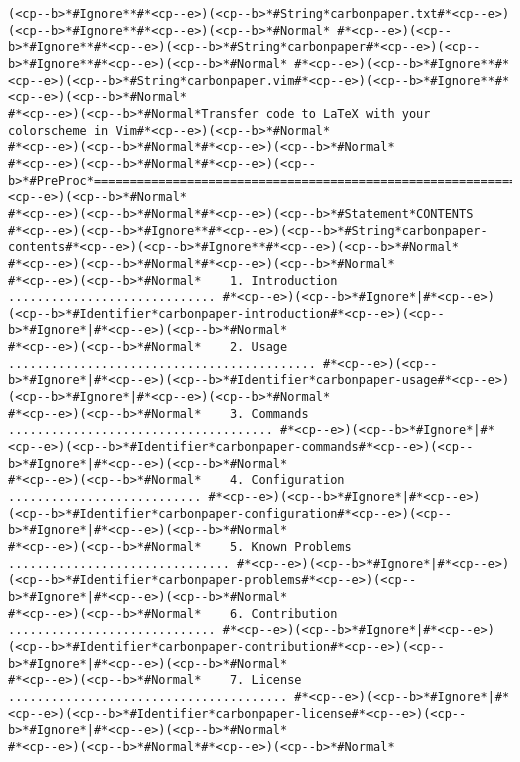 \begin{lstlisting}[style=carbonpaper]
(<cp--b>*#Ignore**#*<cp--e>)(<cp--b>*#String*carbonpaper.txt#*<cp--e>)(<cp--b>*#Ignore**#*<cp--e>)(<cp--b>*#Normal* #*<cp--e>)(<cp--b>*#Ignore**#*<cp--e>)(<cp--b>*#String*carbonpaper#*<cp--e>)(<cp--b>*#Ignore**#*<cp--e>)(<cp--b>*#Normal* #*<cp--e>)(<cp--b>*#Ignore**#*<cp--e>)(<cp--b>*#String*carbonpaper.vim#*<cp--e>)(<cp--b>*#Ignore**#*<cp--e>)(<cp--b>*#Normal*
#*<cp--e>)(<cp--b>*#Normal*Transfer code to LaTeX with your colorscheme in Vim#*<cp--e>)(<cp--b>*#Normal*
#*<cp--e>)(<cp--b>*#Normal*#*<cp--e>)(<cp--b>*#Normal*
#*<cp--e>)(<cp--b>*#Normal*#*<cp--e>)(<cp--b>*#PreProc*==============================================================================#*<cp--e>)(<cp--b>*#Normal*
#*<cp--e>)(<cp--b>*#Normal*#*<cp--e>)(<cp--b>*#Statement*CONTENTS                                                #*<cp--e>)(<cp--b>*#Ignore**#*<cp--e>)(<cp--b>*#String*carbonpaper-contents#*<cp--e>)(<cp--b>*#Ignore**#*<cp--e>)(<cp--b>*#Normal*
#*<cp--e>)(<cp--b>*#Normal*#*<cp--e>)(<cp--b>*#Normal*
#*<cp--e>)(<cp--b>*#Normal*    1. Introduction ............................. #*<cp--e>)(<cp--b>*#Ignore*|#*<cp--e>)(<cp--b>*#Identifier*carbonpaper-introduction#*<cp--e>)(<cp--b>*#Ignore*|#*<cp--e>)(<cp--b>*#Normal*
#*<cp--e>)(<cp--b>*#Normal*    2. Usage ........................................... #*<cp--e>)(<cp--b>*#Ignore*|#*<cp--e>)(<cp--b>*#Identifier*carbonpaper-usage#*<cp--e>)(<cp--b>*#Ignore*|#*<cp--e>)(<cp--b>*#Normal*
#*<cp--e>)(<cp--b>*#Normal*    3. Commands ..................................... #*<cp--e>)(<cp--b>*#Ignore*|#*<cp--e>)(<cp--b>*#Identifier*carbonpaper-commands#*<cp--e>)(<cp--b>*#Ignore*|#*<cp--e>)(<cp--b>*#Normal*
#*<cp--e>)(<cp--b>*#Normal*    4. Configuration ........................... #*<cp--e>)(<cp--b>*#Ignore*|#*<cp--e>)(<cp--b>*#Identifier*carbonpaper-configuration#*<cp--e>)(<cp--b>*#Ignore*|#*<cp--e>)(<cp--b>*#Normal*
#*<cp--e>)(<cp--b>*#Normal*    5. Known Problems ............................... #*<cp--e>)(<cp--b>*#Ignore*|#*<cp--e>)(<cp--b>*#Identifier*carbonpaper-problems#*<cp--e>)(<cp--b>*#Ignore*|#*<cp--e>)(<cp--b>*#Normal*
#*<cp--e>)(<cp--b>*#Normal*    6. Contribution ............................. #*<cp--e>)(<cp--b>*#Ignore*|#*<cp--e>)(<cp--b>*#Identifier*carbonpaper-contribution#*<cp--e>)(<cp--b>*#Ignore*|#*<cp--e>)(<cp--b>*#Normal*
#*<cp--e>)(<cp--b>*#Normal*    7. License ....................................... #*<cp--e>)(<cp--b>*#Ignore*|#*<cp--e>)(<cp--b>*#Identifier*carbonpaper-license#*<cp--e>)(<cp--b>*#Ignore*|#*<cp--e>)(<cp--b>*#Normal*
#*<cp--e>)(<cp--b>*#Normal*#*<cp--e>)(<cp--b>*#Normal*

\end{lstlisting}
